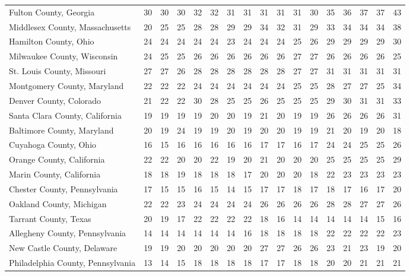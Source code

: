 \begin{landscape}
\begin{longtable}{lcccccccccccccccc}
	Fulton County, Georgia & 30 & 30 & 30 & 32 & 32 & 31 & 31 & 31 & 31 & 31 & 30 & 35 & 36 & 37 & 37 & 43 \\
	Middlesex County, Massachusetts & 20 & 25 & 25 & 28 & 28 & 29 & 29 & 34 & 32 & 31 & 29 & 33 & 34 & 34 & 34 & 38 \\
	Hamilton County, Ohio & 24 & 24 & 24 & 24 & 24 & 23 & 24 & 24 & 24 & 25 & 26 & 29 & 29 & 29 & 29 & 30 \\
	Milwaukee County, Wisconsin & 24 & 25 & 25 & 26 & 26 & 26 & 26 & 26 & 26 & 27 & 27 & 26 & 26 & 26 & 26 & 25 \\
	St. Louis County, Missouri & 27 & 27 & 26 & 28 & 28 & 28 & 28 & 28 & 28 & 27 & 27 & 31 & 31 & 31 & 31 & 31 \\
	Montgomery County, Maryland & 22 & 22 & 22 & 24 & 24 & 24 & 24 & 24 & 24 & 25 & 25 & 28 & 27 & 27 & 25 & 34 \\
	Denver County, Colorado & 21 & 22 & 22 & 30 & 28 & 25 & 25 & 26 & 25 & 25 & 25 & 29 & 30 & 31 & 31 & 33 \\
	Santa Clara County, California & 19 & 19 & 19 & 19 & 20 & 20 & 19 & 21 & 20 & 19 & 19 & 26 & 26 & 26 & 26 & 31 \\
	Baltimore County, Maryland & 20 & 19 & 24 & 19 & 19 & 20 & 19 & 20 & 20 & 19 & 19 & 21 & 20 & 19 & 20 & 18 \\
	Cuyahoga County, Ohio & 16 & 15 & 16 & 16 & 16 & 16 & 16 & 17 & 17 & 16 & 17 & 24 & 24 & 25 & 25 & 26 \\
	Orange County, California & 22 & 22 & 20 & 20 & 22 & 19 & 20 & 21 & 20 & 20 & 20 & 25 & 25 & 25 & 25 & 29 \\
	Marin County, California & 18 & 18 & 19 & 18 & 18 & 18 & 17 & 20 & 20 & 20 & 18 & 22 & 23 & 23 & 23 & 23 \\
	Chester County, Pennsylvania & 17 & 15 & 15 & 16 & 15 & 14 & 15 & 17 & 17 & 18 & 17 & 18 & 17 & 16 & 17 & 20 \\
	Oakland County, Michigan & 22 & 22 & 23 & 24 & 24 & 24 & 24 & 26 & 26 & 26 & 26 & 28 & 28 & 27 & 27 & 26 \\
	Tarrant County, Texas & 20 & 19 & 17 & 22 & 22 & 22 & 22 & 18 & 16 & 14 & 14 & 14 & 14 & 14 & 15 & 16 \\
	Allegheny County, Pennsylvania & 14 & 14 & 14 & 14 & 14 & 14 & 16 & 18 & 18 & 18 & 18 & 22 & 22 & 22 & 22 & 23 \\
	New Castle County, Delaware & 19 & 19 & 20 & 20 & 20 & 20 & 20 & 27 & 27 & 26 & 26 & 23 & 21 & 23 & 19 & 20 \\
	Philadelphia County, Pennsylvania & 13 & 14 & 15 & 18 & 18 & 18 & 18 & 17 & 17 & 18 & 18 & 20 & 20 & 21 & 21 & 21 \\

\end{longtable}
\end{landscape}
